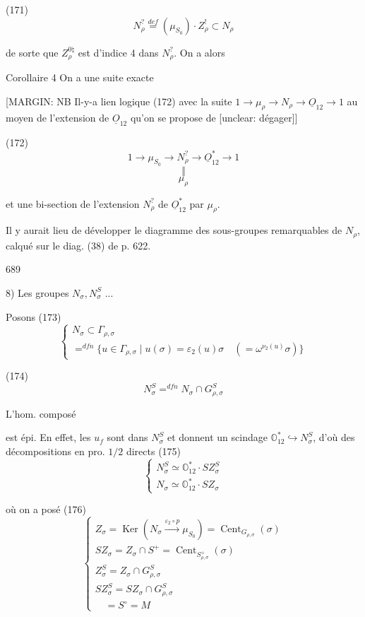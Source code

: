 (171) $$N_{\rho}^{?} \overset{def}{=} (\mu_{S_0}) \cdot Z_{\rho}^{!} \subset N_{\rho}$$

de sorte que $Z_{\rho}^{0 \natural}$ est d'indice 4 dans $N_{\rho}^{?}$. On a alors

Corollaire 4 On a une suite exacte

[MARGIN: NB Il-y-a lien logique (172) avec la suite $1 \to \mu_{\rho} \to N_{\rho} \to \underline{O}_{12} \to 1$ au moyen de l'extension de $\underline{O}_{12}$ qu'on se propose de [unclear: dégager]]

(172) $$1 \longrightarrow \mu_{S_0} \longrightarrow N_{\rho}^{?} \longrightarrow \underline{O}_{12}^{*} \longrightarrow 1$$
$$ \Vert $$
$$ \mu_{\rho} $$

et une bi-section de l'extension
$N_{\rho}^{?}$ de $\underline{O}_{12}^{*}$ par $\mu_{\rho}$.

Il y aurait lieu de développer
le diagramme des sous-groupes
remarquables de $N_{\rho}$, calqué sur
le diag. (38) de p. 622.

\newpage


689

8) Les groupes $N_{\sigma}, N_{\sigma}^S$ ...

Posons
(173) $$ \begin{cases} N_{\sigma} \subset \Gamma_{\rho,\sigma} \\ =^{dfn} \{ u \in \Gamma_{\rho,\sigma} \mid u(\sigma) = \varepsilon_2(u)\sigma \quad (= \omega^{\nu_2(u)} \sigma) \} \end{cases} $$

(174) $$ N_{\sigma}^S =^{dfn} N_{\sigma} \cap G_{\rho,\sigma}^S $$

L'hom. composé
est épi. En effet, les $u_f$ sont dans $N_{\sigma}^S$ et donnent un scindage $\mathbb{O}_{12}^* \hookrightarrow N_{\sigma}^S$, d'où des décompositions en pro. $1/2$ directs
(175) $$ \begin{cases} N_{\sigma}^S \simeq \mathbb{O}_{12}^* \cdot S Z_{\sigma}^S \\ N_{\sigma} \simeq \mathbb{O}_{12}^* \cdot S Z_{\sigma} \end{cases} $$

où on a posé
(176) $$ \begin{cases} Z_{\sigma} = \operatorname{Ker}(N_{\sigma} \xrightarrow{\varepsilon_2 \circ p} \mu_{S_0}) = \operatorname{Cent}_{G_{\rho,\sigma}}(\sigma) \\ S Z_{\sigma} = Z_{\sigma} \cap S^+ = \operatorname{Cent}_{S^+_{\rho,\sigma}}(\sigma) \\ Z_{\sigma}^S = Z_{\sigma} \cap G_{\rho,\sigma}^S \\ S Z_{\sigma}^S = S Z_{\sigma} \cap G_{\rho,\sigma}^S \\ \quad = S^{\circ} = M \end{cases} $$


